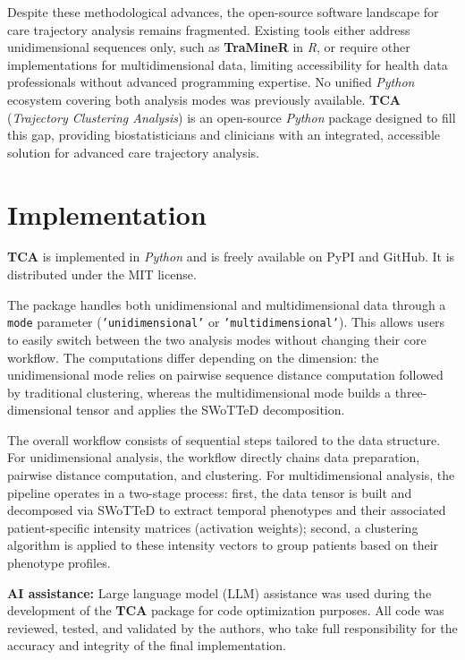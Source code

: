 \documentclass[pdflatex,sn-mathphys-num,referee,lineno]{sn-jnl}
\newcommand{\proglang}[1]{\textit{#1}}
\newcommand{\code}[1]{\texttt{#1}}
\newcommand{\pkg}[1]{\textbf{#1}}
\begin{document}
Despite these methodological advances, the open-source software landscape for care trajectory analysis remains fragmented.
Existing tools either address unidimensional sequences only, such as \pkg{TraMineR} in \proglang{R}, or require other implementations for multidimensional data, limiting accessibility for health data professionals without advanced programming expertise.
No unified \proglang{Python} ecosystem covering both analysis modes was previously available.
\pkg{TCA} (\emph{Trajectory Clustering Analysis}) is an open-source \proglang{Python} package designed to fill this gap, providing biostatisticians and clinicians with an integrated, accessible solution for advanced care trajectory analysis.

\section{Implementation}\label{sec:implementation}

\pkg{TCA} is implemented in \proglang{Python} and is freely available on PyPI and GitHub. 
It is distributed under the MIT license.

The package handles both unidimensional and multidimensional data through a \code{mode} parameter (\code{'unidimensional'} or \code{'multidimensional'}). This allows users to easily switch between the two analysis modes without changing their core workflow. The computations differ depending on the dimension: the unidimensional mode relies on pairwise sequence distance computation followed by traditional clustering, whereas the multidimensional mode builds a three-dimensional tensor and applies the SWoTTeD decomposition.

The overall workflow consists of sequential steps tailored to the data structure. For unidimensional analysis, the workflow directly chains data preparation, pairwise distance computation, and clustering. For multidimensional analysis, the pipeline operates in a two-stage process: first, the data tensor is built and decomposed via SWoTTeD to extract temporal phenotypes and their associated patient-specific intensity matrices (activation weights); second, a clustering algorithm is applied to these intensity vectors to group patients based on their phenotype profiles. 

\textbf{AI assistance:} Large language model (LLM) assistance was used during the development of the \pkg{TCA} package for code optimization purposes. 
All code was reviewed, tested, and validated by the authors, who take full responsibility for the accuracy and integrity of the final implementation.
\end{document}
